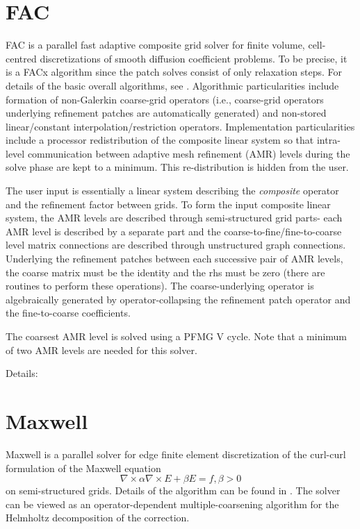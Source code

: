 
\section{FAC}

FAC is a parallel fast adaptive composite grid solver for finite volume,
cell-centred discretizations of smooth diffusion coefficient problems. 
To be precise, it is a FACx algorithm since the patch solves consist of only
relaxation steps. For details of the basic overall algorithms, see \cite{SFMcCormick_1989a}.
Algorithmic particularities include formation of non-Galerkin coarse-grid operators
(i.e., coarse-grid operators underlying refinement patches are automatically generated)
and non-stored linear/constant interpolation/restriction operators. Implementation particularities
include a processor redistribution of the composite linear system so that intra-level 
communication between adaptive mesh refinement (AMR) levels during the solve phase
are kept to a minimum. This re-distribution is hidden from the user.

The user input is essentially a linear system describing the {\it composite}
operator and the refinement factor between grids. To form the input composite linear system,
the AMR levels are described through semi-structured grid parts-
each AMR level is described by a separate part and the coarse-to-fine/fine-to-coarse level matrix connections 
are described through unstructured graph connections. Underlying the refinement patches between
each successive pair of AMR levels, the coarse matrix must be the identity and the rhs must
be zero (there are routines to perform these operations). The coarse-underlying operator is
algebraically generated by operator-collapsing the refinement patch operator and the fine-to-coarse
coefficients. 

The coarsest AMR level is solved using a PFMG V cycle. Note that a minimum of two AMR levels
are needed for this solver.

Details:


\section{Maxwell}

Maxwell is a parallel solver for edge finite element discretization of the
curl-curl formulation of the Maxwell equation
\[ \nabla \times \alpha \nabla \times E + \beta E= f, \beta> 0\]
on semi-structured grids. Details of the algorithm can be found in \cite{JonesLee_2006}.
The solver can be viewed as an operator-dependent multiple-coarsening algorithm for the Helmholtz
decomposition of the correction.

